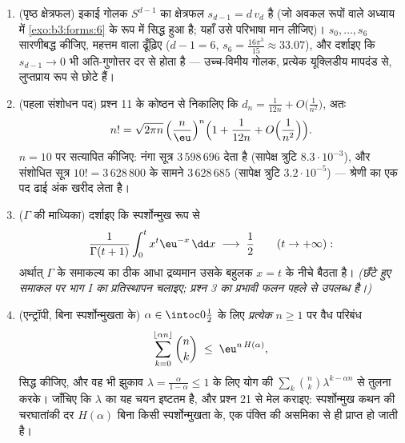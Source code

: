 \begin{problem}
\begin{enumerate}[resume]
        हैं)।
  \item (पृष्ठ क्षेत्रफल) इकाई गोलक $S^{d-1}$ का क्षेत्रफल $s_{d-1} = d\,v_d$ है
        (जो अवकल रूपों वाले अध्याय में \cref{exo:b3:forms:6} के रूप में सिद्ध हुआ
        है; यहाँ उसे परिभाषा मान लीजिए)। $s_0, \dots, s_6$ सारणीबद्ध कीजिए,
        महत्तम वाला ढूँढ़िए ($d - 1 =
        6$, $s_6 = \frac{16\pi^3}{15} \approx 33.07$), और दर्शाइए कि $s_{d-1} \to 0$
        भी अति-गुणोत्तर दर से होता है --- उच्च-विमीय गोलक,
        प्रत्येक यूक्लिडीय मापदंड से, लुप्तप्राय रूप से छोटे हैं।
  \item (पहला संशोधन पद) प्रश्न 11 के कोष्ठन से निकालिए कि
        $d_n = \frac1{12n} +
        O\bigl(\frac1{n^2}\bigr)$, अतः
        \[
        n! = \sqrt{2\pi n}\,\Bigl(\frac
        n\eu\Bigr)^{n}\Bigl(1 + \frac1{12n} +
        O\Bigl(\frac1{n^2}\Bigr)\Bigr).
        \]
        $n = 10$ पर सत्यापित कीजिए: नंगा सूत्र $3\,598\,696$ देता है
        (सापेक्ष त्रुटि $8.3\cdot10^{-3}$), और संशोधित सूत्र $10! =
        3\,628\,800$ के सामने
        $3\,628\,685$ (सापेक्ष त्रुटि $3.2\cdot10^{-5}$) --- श्रेणी का एक पद ढाई
        अंक खरीद लेता है।
  \item ($\Gamma$ की माध्यिका) दर्शाइए कि स्पर्शोन्मुख रूप से
        \[
        \frac{1}{\Gamma(t+1)}
        \int_0^{t} x^{t}\eu^{-x}\,\dd x
        \;\longrightarrow\; \frac12
        \qquad (t \to +\infty) :
        \]
        अर्थात् $\Gamma$ के समाकल्य का ठीक आधा द्रव्यमान उसके बहुलक
        $x = t$ के नीचे बैठता है। \emph{(छँटे हुए समाकल पर भाग I का
        प्रतिस्थापन चलाइए; प्रश्न 3 का प्रभावी फलन पहले से
        उपलब्ध है।)}
  \item (एन्ट्रॉपी, बिना स्पर्शोन्मुखता के) $\alpha \in
        \intoc0{\frac12}$ के लिए
        \emph{प्रत्येक} $n \geq 1$ पर वैध परिबंध
        \[
        \sum_{k=0}^{\lfloor\alpha n\rfloor}\binom nk
        \;\leq\; \eu^{n\,H(\alpha)} ,
        \]
        सिद्ध कीजिए, और वह भी झुकाव $\lambda =
        \frac{\alpha}{1-\alpha} \leq 1$ के लिए योग की $\sum_k\binom
        nk\lambda^{k-\alpha n}$ से
        तुलना करके। जाँचिए कि $\lambda$ का यह चयन इष्टतम है, और प्रश्न
        21 से मेल कराइए: स्पर्शोन्मुख कथन की चरघातांकी दर $H(\alpha)$
        बिना किसी स्पर्शोन्मुखता के, एक पंक्ति की असमिका से ही
        प्राप्त हो जाती है।
\end{enumerate}
\end{problem}
